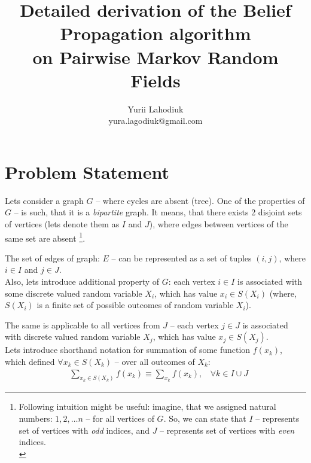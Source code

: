 \documentclass[fleqn,leqno]{article}
\begin{document}
\title{Detailed derivation of the Belief Propagation algorithm \\ on Pairwise Markov Random Fields}
\author{Yurii Lahodiuk \\ yura.lagodiuk@gmail.com}
\date{}
\maketitle

\section{Problem Statement}

Lets consider a graph $G$ -- where cycles are absent (tree). One of the properties of $G$ -- is such, that it is a \emph{bipartite} graph. It means, that there exists 2 disjoint sets of vertices (lets denote them as $I$ and $J$), where edges between vertices of the same set are absent \footnote{Following intuition might be useful: imagine, that we assigned natural numbers: $1, 2, \dots n$ -- for all vertices of $G$. So, we can state that $I$ -- represents set of vertices with \emph{odd} indices, and $J$ -- represents set of vertices with \emph{even} indices.\\}.

The set of edges of graph: $E$ -- can be represented as a set of tuples $(i, j)$, where $i \in I$ and $j \in J$.\\

Also, lets introduce additional property of $G$: each vertex $i \in I$ is associated with some discrete valued random variable $X_i$, which has value $x_i \in S(X_i)$ (where, $S(X_i)$ is a finite set of possible outcomes of random variable $X_i$). 

The same is applicable to all vertices from $J$ -- each vertex $j \in J$ is associated with discrete valued random variable $X_j$, which has value $x_j \in S(X_j)$. \\

Lets introduce shorthand notation for summation of some function $f(x_k)$, which defined $\forall x_k \in S(X_k)$ -- over all outcomes of $X_k$:
\begin{equation}
\begin{split}
   & \sum_{x_k \in S(X_k)} f(x_k) \equiv \sum_{x_k} f(x_k), \ \ \ \ \forall k \in I \cup J
\end{split}
\end{equation}
\end{document}
